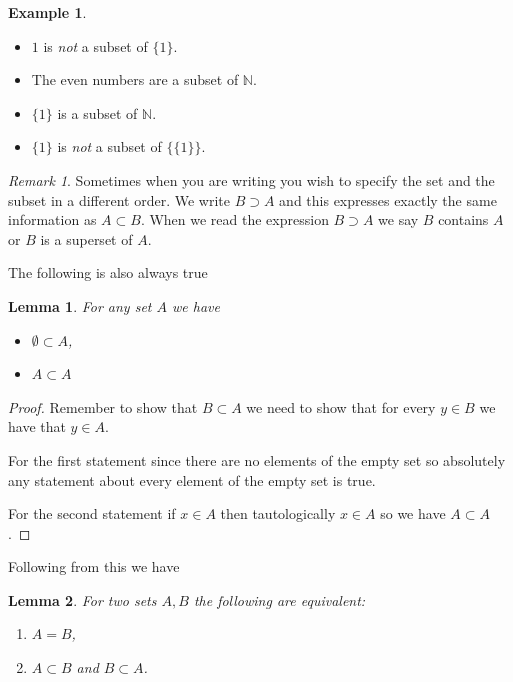 \documentclass[
]{book}
\providecommand{\tightlist}{%
  \setlength{\itemsep}{0pt}\setlength{\parskip}{0pt}}
\newtheorem{lemma}{Lemma}[chapter]
\theoremstyle{definition}
\theoremstyle{definition}
\newtheorem{example}{Example}[chapter]
\theoremstyle{definition}
\theoremstyle{definition}
\theoremstyle{remark}
\newtheorem*{remark}{Remark}
\begin{document}
\begin{example}

\begin{itemize}
\tightlist
\item
  \(1\) is \emph{not} a subset of \(\{1\}\).
\item
  The even numbers are a subset of \(\mathbb{N}\).
\item
  \(\{1\}\) is a subset of \(\mathbb{N}\).
\item
  \(\{1\}\) is \emph{not} a subset of \(\{\{1\}\}\).
\end{itemize}

\end{example}

\begin{remark}
Sometimes when you are writing you wish to specify the set and the subset in a different order. We write \(B \supset A\) and this expresses exactly the same information as \(A \subset B\). When we read the expression \(B \supset A\) we say \(B\) contains \(A\) or \(B\) is a superset of \(A\).
\end{remark}

The following is also always true

\begin{lemma}

For any set \(A\) we have

\begin{itemize}
\item
  \(\emptyset \subset A\),
\item
  \(A \subset A\)
\end{itemize}

\end{lemma}

\begin{proof}
Remember to show that \(B \subset A\) we need to show that for every \(y \in B\) we have that \(y \in A\).

For the first statement since there are no elements of the empty set so absolutely any statement about every element of the empty set is true.

For the second statement if \(x \in A\) then tautologically \(x \in A\) so we have \(A \subset A\).
\end{proof}

Following from this we have

\begin{lemma}

For two sets \(A, B\) the following are equivalent:

\begin{enumerate}
\def\labelenumi{\arabic{enumi}.}
\item
  \(A = B\),
\item
  \(A \subset B\) and \(B \subset A\).
\end{enumerate}

\end{lemma}
\end{document}
